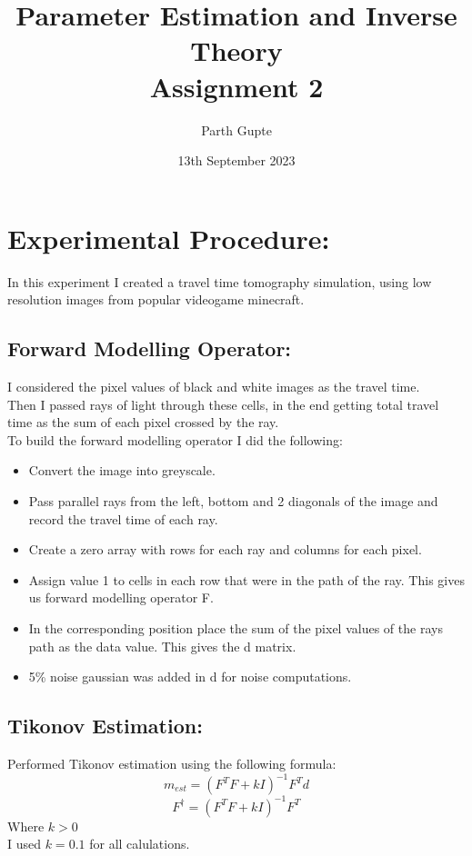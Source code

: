 \documentclass{article}
\title{Parameter Estimation and Inverse Theory\\ Assignment 2}
\author{Parth Gupte}
\date{13th September 2023}
\begin{document}
\maketitle
\section{Experimental Procedure:}
In this experiment I created a travel time tomography simulation, using low resolution images from popular videogame minecraft.\\
\subsection{Forward Modelling Operator:}
I considered the pixel values of black and white images as the travel time.\\
Then I passed rays of light through these cells, in the end getting total travel time as the sum of each pixel crossed by the ray.\\
To build the forward modelling operator I did the following:
\begin{itemize}
    \item Convert the image into greyscale.
    \item Pass parallel rays from the left, bottom and 2 diagonals of the image and record the travel time of each ray.
    \item Create a zero array with rows for each ray and columns for each pixel.
    \item Assign value 1 to cells in each row that were in the path of the ray. This gives us forward modelling operator F.
    \item In the corresponding position place the sum of the pixel values of the rays path as the data value. This gives the d matrix.  
    \item 5\% noise gaussian was added in d for noise computations. 
\end{itemize}

\subsection{Tikonov Estimation:}
Performed Tikonov estimation using the following formula:
\begin{displaymath}
    m_{est} = (F^TF+kI)^{-1}F^Td 
\end{displaymath}
\begin{displaymath}
    F^{\dagger} = (F^TF+kI)^{-1}F^T
\end{displaymath}
Where $k > 0$\\
I used $k = 0.1$ for all calulations.
\end{document}
